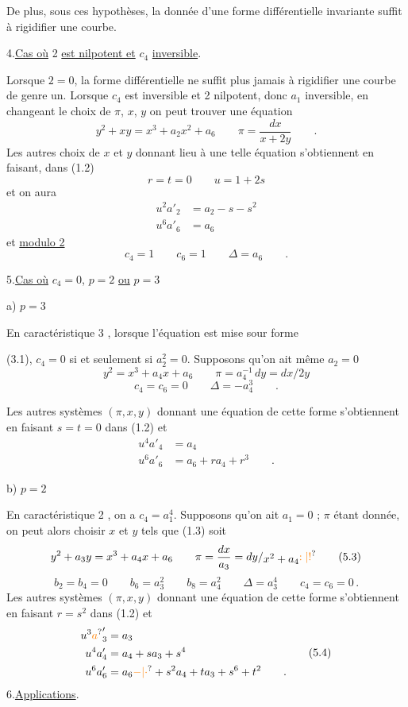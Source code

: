 De plus, sous ces hypothèses, la donnée d'une forme différentielle invariante suffit à rigidifier une courbe.

4.\qquad \uline{Cas où} 2 \uline{est nilpotent et} $c_4$ \uline{inversible}.

Lorsque $2=0$, la forme différentielle ne suffit plus jamais à rigidifier une courbe de genre un. Lorsque $c_4$ est inversible et 2 nilpotent, donc $a_1$ inversible, en changeant le choix de $\pi$, $x$, $y$ on peut trouver une équation
\[
y^2+xy=x^3+a_2x^2+a_6\qquad \pi=\frac{dx}{x+2y}\qquad .\tag*{(4.1)}
\]
Les autres choix de $x$ et $y$ donnant lieu à une telle équation s'obtiennent en faisant, dans (1.2)
\[
r=t=0\qquad u=1+2s\tag*{(4.2)}
\]
et on aura
\[
\begin{aligned}
u^2a'_2&=a_2-s-s^2\\
u^6a'_6&=a_6
\end{aligned}\tag*{(4.3)}
\]
et \uline{modulo 2}
\[
c_4=1\qquad c_6=1\qquad \Delta=a_6\qquad .\tag*{(4.4)}
\]

5.\qquad \uline{Cas où} $c_4=0$, $p=2$ \uline{ou} $p=3$

a) $p=3$

En caractéristique 3 , lorsque l'équation est mise sour forme

(3.1), $c_4=0$ si et seulement si $a_2^2=0$. Supposons qu'on ait même $a_2=0$
\[
y^2=x^3+a_4x+a_6\qquad \pi=a_4^{-1}\,dy=dx/2y\tag*{(5.1)}
\]
\[
c_4=c_6=0\qquad \Delta=-a_4^3\qquad .
\]

Les autres systèmes $(\pi,x,y)$ donnant une équation de cette forme s'obtiennent en faisant $s=t=0$ dans (1.2) et
\[
\begin{aligned}
u^4a'_4&=a_4\\
u^6a'_6&=a_6+ra_4+r^3\qquad .
\end{aligned}\tag*{(5.2)}
\]

b) $p=2$

En caractéristique 2 , on a $c_4=a_1^4$. Supposons qu'on ait $a_1=0$ ; $\pi$ étant donnée, on peut alors choisir $x$ et $y$ tels que (1.3) soit
\[
y^2+a_3y=x^3+a_4x+a_6\qquad\pi=\frac{dx}{a_3}=dy/\raisebox{-.45ex}{$x^2+a_4$}\unsure{:|!}\tag*{(5.3)}
\]
\[
b_2=b_4=0\qquad b_6=a_3^2\qquad b_8=a_4^2\qquad\Delta=a_3^4\qquad c_4=c_6=0\, .
\]
Les autres systèmes $(\pi,x,y)$ donnant une équation de cette forme s'obtiennent en faisant $r=s^2$ dans (1.2) et
\[
\begin{aligned}
u^3\unsure{a}'_3&=a_3\\
u^4a'_4&=a_4+sa_3+s^4\\
u^6a'_6&=a_6\unsure{-|\cdot}+s^2a_4+ta_3+s^6+t^2\qquad .
\end{aligned}\tag*{(5.4)}
\]
6.\qquad \uline{Applications}.

